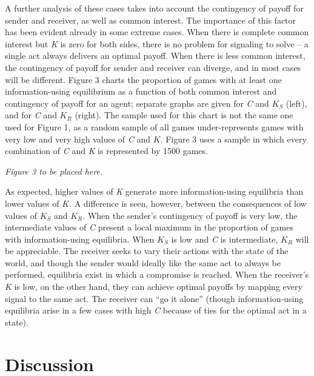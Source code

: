 \documentclass[10pt]{article}
\begin{document}
A further analysis of these cases takes into account the contingency of
payoff for sender and receiver, as well as common interest. The
importance of this factor has been evident already in some extreme
cases. When there is complete common interest but \emph{K} is zero for
both sides, there is no problem for signaling to solve -- a single act
always delivers an optimal payoff. When there is less common interest,
the contingency of payoff for sender and receiver can diverge, and in
most cases will be different. Figure 3 charts the proportion of games
with at least one information-using equilibrium as a function of both
common interest and contingency of payoff for an agent; separate graphs
are given for \emph{C} and $K_S$ (left), and for \emph{C} and $K_R$
(right). The sample used for this chart is not the same one used for
Figure 1, as a random sample of all games under-represents games with
very low and very high values of \emph{C} and $K$. Figure 3 uses a sample
in which every combination of \emph{C} and \emph{K} is represented by
1500 games.

\emph{Figure 3 to be placed here.}

As expected, higher values of \emph{K} generate more information-using
equilibria than lower values of $K$. A difference is seen, however,
between the consequences of low values of $K_S$ and $K_R$. When the
sender's contingency of payoff is very low, the intermediate values of
\emph{C} present a local maximum in the proportion of games with
information-using equilibria. When $K_S$ is low and \emph{C} is
intermediate, $K_R$ will be appreciable. The receiver seeks to vary
their actions with the state of the world, and though the sender would
ideally like the same act to always be performed, equilibria exist in
which a compromise is reached. When the receiver's \emph{K} is low, on
the other hand, they can achieve optimal payoffs by mapping every signal
to the same act. The receiver can ``go it alone'' (though
information-using equilibria arise in a few cases with high \emph{C}
because of ties for the optimal act in a state).

\section*{Discussion}
\end{document}
